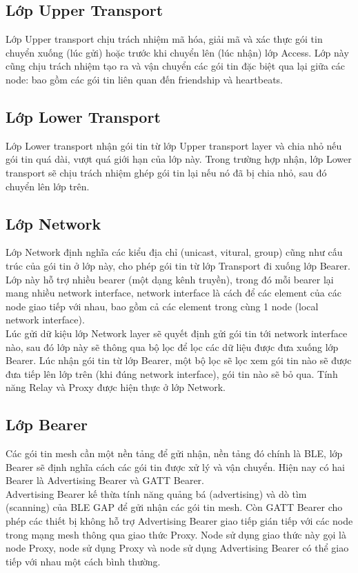     \subsection{Lớp Upper Transport}
    Lớp Upper transport chịu trách nhiệm mã hóa, giải mã và xác thực gói tin chuyển xuống (lúc gửi) hoặc trước khi chuyển lên (lúc nhận) lớp Access. Lớp này cũng chịu trách nhiệm tạo ra và vận chuyển các gói tin đặc biệt qua lại giữa các node: bao gồm các gói tin liên quan đến friendship và heartbeats.
    \subsection{Lớp Lower Transport}
    Lớp Lower transport nhận gói tin từ lớp Upper transport layer và chia nhỏ nếu gói tin quá dài, vượt quá giới hạn của lớp này. Trong trường hợp nhận, lớp Lower transport sẽ chịu trách nhiệm ghép gói tin lại nếu nó đã bị chia nhỏ, sau đó chuyển lên lớp trên.
    \subsection{Lớp Network}
    Lớp Network định nghĩa các kiểu địa chỉ (unicast, vitural, group) cũng như cấu trúc của gói tin ở lớp này, cho phép gói tin từ lớp Transport đi xuống lớp Bearer. Lớp này hỗ trợ nhiều bearer (một dạng kênh truyền), trong đó mỗi bearer lại mang nhiều network interface, network interface là cách để các element của các node giao tiếp với nhau, bao gồm cả các element trong cùng 1 node (local network interface). \\
    
    Lúc gửi dữ kiệu lớp Network layer sẽ quyết định gửi gói tin tới network interface nào, sau đó lớp này sẽ thông qua bộ lọc để lọc các dữ liệu được đưa xuống lớp Bearer. Lúc nhận gói tin từ lớp Bearer, một bộ lọc sẽ lọc xem gói tin nào sẽ được đưa tiếp lên lớp trên (khi đúng network interface), gói tin nào sẽ bỏ qua. Tính năng Relay và Proxy được hiện thực ở lớp Network.
    \subsection{Lớp Bearer}
    Các gói tin mesh cần một nền tảng để gửi nhận, nền tảng đó chính là BLE, lớp Bearer sẽ định nghĩa cách các gói tin được xử lý và vận chuyển. Hiện nay có hai Bearer là Advertising Bearer và GATT Bearer.\\
    
    Advertising Bearer kế thừa tính năng quảng bá (advertising) và dò tìm (scanning) của BLE GAP để gửi nhận các gói tin mesh. Còn GATT Bearer cho phép các thiết bị không hỗ trợ Advertising Bearer giao tiếp gián tiếp với các node trong mạng mesh thông qua giao thức Proxy. Node sử dụng giao thức này gọi là node Proxy, node sử dụng Proxy và node sử dụng Advertising Bearer có thể giao tiếp với nhau một cách bình thường.\\
    
